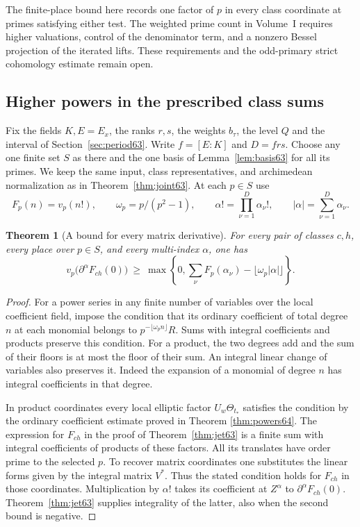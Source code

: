 \documentclass[a4paper,11pt]{article}
\newtheorem{theorem}[proposition]{Theorem}
\theoremstyle{definition}
\theoremstyle{remark}
\numberwithin{equation}{section}
\begin{document}
The finite-place bound here records one factor of \(p\) in every
class coordinate at primes satisfying either test. The weighted
prime count in Volume~I requires higher valuations, control of
the denominator term, and a nonzero Bessel projection of the
iterated lifts. These requirements and the odd-primary strict
cohomology estimate remain open.

\subsection{Higher powers in the prescribed class sums}\label{nav:V-15}
\label{sec:powers65}

Fix the fields \(K,E=E_x\), the ranks \(r,s\), the weights
\(b_\tau\), the level \(Q\) and the interval of
Section~\ref{sec:period63}. Write \(f=[E:K]\) and \(D=frs\).
Choose any one finite set \(S\) as there and the one basis
of Lemma~\ref{lem:basis63} for all its primes. We keep the same
input, class representatives, and archimedean normalization as in
Theorem~\ref{thm:joint63}. At each \(p\in S\) use
\[
   F_p(n)=v_p(n!),\qquad \omega_p=p/(p^2-1),\qquad
   \alpha!=\prod_{\nu=1}^{D}\alpha_\nu!,\qquad
   |\alpha|=\sum_{\nu=1}^{D}\alpha_\nu .
\]

\begin{theorem}[A bound for every matrix derivative]\label{thm:matrix65}
For every pair of classes \(c,h\), every place over \(p\in S\),
and every multi-index \(\alpha\), one has
\begin{equation}
 v_p\big(\partial^\alpha F_{ch}(0)\big)\ \ge\ 
 \max\left\{0,\sum_\nu F_p(\alpha_\nu)
                         -\lfloor\omega_p|\alpha|\rfloor\right\}.
                                                        \label{eq:matrix65}
\end{equation}
\end{theorem}
\begin{proof}
For a power series in any finite number of variables over the
local coefficient field, impose the condition that its ordinary
coefficient of total degree \(n\) at each monomial belongs to
\(p^{-\lfloor\omega_p n\rfloor}R\). Sums with integral
coefficients and products preserve this condition. For a product,
the two degrees add and the sum of their floors is at most the
floor of their sum. An integral linear change of variables also
preserves it. Indeed the expansion of a monomial of degree \(n\)
has integral coefficients in that degree.

In product coordinates every local elliptic factor
\(U_w\Theta_{t_*}\) satisfies the condition by the ordinary
coefficient estimate proved in
Theorem \ref{thm:powers64}.
The expression for \(F_{ch}\) in the proof of Theorem~\ref{thm:jet63}
is a finite sum with integral coefficients of products of these
factors. All its translates have order prime to the selected \(p\).
To recover matrix coordinates one substitutes the linear forms
given by the integral matrix \(V^*\). Thus the stated condition
holds for \(F_{ch}\) in those coordinates. Multiplication by
\(\alpha!\) takes its coefficient at \(Z^\alpha\) to
\(\partial^\alpha F_{ch}(0)\). Theorem~\ref{thm:jet63} supplies
integrality of the latter, also when the second bound is negative.
\end{proof}
\end{document}
